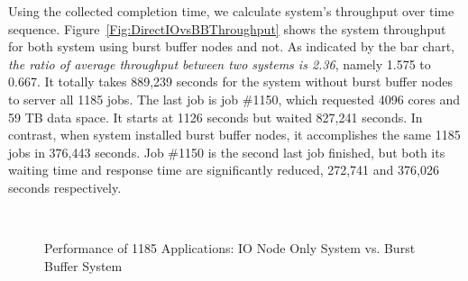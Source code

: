 Using the collected completion time, we calculate system's throughput over time sequence.
Figure~\ref{Fig:DirectIOvsBBThroughput} shows the system throughput for
both system using burst buffer nodes and not.
As indicated by the bar chart,
\textit{the ratio of average throughput between two systems is 2.36},
namely 1.575 to 0.667.
It totally takes 889,239 seconds for the system without burst buffer nodes to
server all 1185 jobs.
The last job is job \#1150, which requested 4096 cores and 59 TB data space.
It starts at 1126 seconds but waited 827,241 seconds.
In contrast, when system installed burst buffer nodes,
it accomplishes the same 1185 jobs in 376,443 seconds.
Job \#1150 is the second last job finished, but both its waiting time and response time
are significantly reduced, 272,741 and 376,026 seconds respectively.

\begin{figure}[!t]
        \centering
        ~
        \caption{Performance of 1185 Applications: IO Node Only System vs. Burst Buffer System}
        \label{Fig:DirectIOPerformance}
\end{figure}

